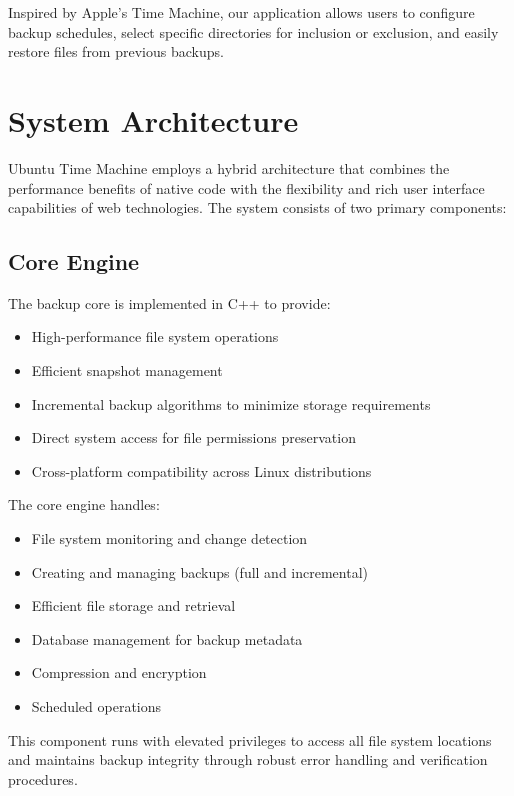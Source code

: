 \documentclass[journal,twoside,10pt]{IEEEtran}
\begin{document}
Inspired by Apple's Time Machine, our application allows users to configure backup schedules, select specific directories for inclusion or exclusion, and easily restore files from previous backups.

\section{System Architecture}
Ubuntu Time Machine employs a hybrid architecture that combines the performance benefits of native code with the flexibility and rich user interface capabilities of web technologies. The system consists of two primary components:

\subsection{Core Engine}
The backup core is implemented in C++ to provide:
\begin{itemize}
    \item High-performance file system operations
    \item Efficient snapshot management
    \item Incremental backup algorithms to minimize storage requirements
    \item Direct system access for file permissions preservation
    \item Cross-platform compatibility across Linux distributions
\end{itemize}

The core engine handles:
\begin{itemize}
    \item File system monitoring and change detection
    \item Creating and managing backups (full and incremental)
    \item Efficient file storage and retrieval
    \item Database management for backup metadata
    \item Compression and encryption
    \item Scheduled operations
\end{itemize}

This component runs with elevated privileges to access all file system locations and maintains backup integrity through robust error handling and verification procedures.
\end{document}
